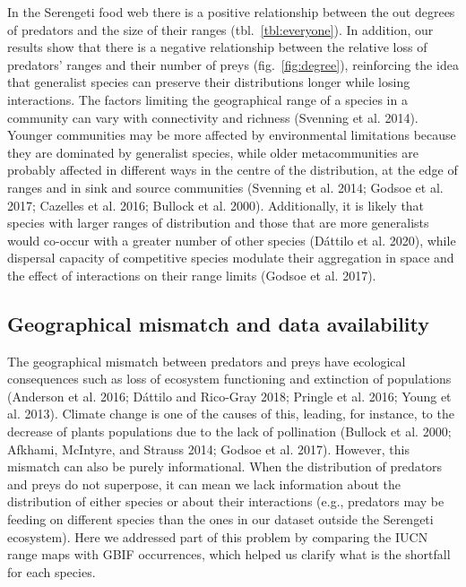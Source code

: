 \documentclass[11pt]{article}
\begin{document}
In the Serengeti food web there is a positive relationship between the
out degrees of predators and the size of their ranges
(tbl.~\ref{tbl:everyone}). In addition, our results show that there is a
negative relationship between the relative loss of predators' ranges and
their number of preys (fig.~\ref{fig:degree}), reinforcing the idea that
generalist species can preserve their distributions longer while losing
interactions. The factors limiting the geographical range of a species
in a community can vary with connectivity and richness (Svenning et al.
2014). Younger communities may be more affected by environmental
limitations because they are dominated by generalist species, while
older metacommunities are probably affected in different ways in the
centre of the distribution, at the edge of ranges and in sink and source
communities (Svenning et al. 2014; Godsoe et al. 2017; Cazelles et al.
2016; Bullock et al. 2000). Additionally, it is likely that species with
larger ranges of distribution and those that are more generalists would
co-occur with a greater number of other species (Dáttilo et al. 2020),
while dispersal capacity of competitive species modulate their
aggregation in space and the effect of interactions on their range
limits (Godsoe et al. 2017).

\hypertarget{geographical-mismatch-and-data-availability}{%
\subsection{Geographical mismatch and data
availability}\label{geographical-mismatch-and-data-availability}}

The geographical mismatch between predators and preys have ecological
consequences such as loss of ecosystem functioning and extinction of
populations (Anderson et al. 2016; Dáttilo and Rico-Gray 2018; Pringle
et al. 2016; Young et al. 2013). Climate change is one of the causes of
this, leading, for instance, to the decrease of plants populations due
to the lack of pollination (Bullock et al. 2000; Afkhami, McIntyre, and
Strauss 2014; Godsoe et al. 2017). However, this mismatch can also be
purely informational. When the distribution of predators and preys do
not superpose, it can mean we lack information about the distribution of
either species or about their interactions (e.g., predators may be
feeding on different species than the ones in our dataset outside the
Serengeti ecosystem). Here we addressed part of this problem by
comparing the IUCN range maps with GBIF occurrences, which helped us
clarify what is the shortfall for each species.
\end{document}

